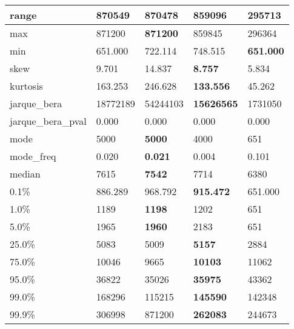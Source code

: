 \begin{table}[H]
\begin{tabular}{|l|m{10em}|m{10em}|m{10em}|m{10em}|}
\hline range & 870549 & \bfseries 870478 & 859096 & \cellcolor[rgb]{0.9, 0.54, 0.52} 295713 \\
\hline max & 871200 & \bfseries 871200 & 859845 & \cellcolor[rgb]{0.9, 0.54, 0.52} 296364 \\
\hline min & 651.000 & 722.114 & \cellcolor[rgb]{0.9, 0.54, 0.52} 748.515 & \bfseries 651.000 \\
\hline skew & 9.701 & \cellcolor[rgb]{0.9, 0.54, 0.52} 14.837 & \bfseries 8.757 & 5.834 \\
\hline kurtosis & 163.253 & 246.628 & \bfseries 133.556 & \cellcolor[rgb]{0.9, 0.54, 0.52} 45.262 \\
\hline jarque\_bera & 18772189 & \cellcolor[rgb]{0.9, 0.54, 0.52} 54244103 & \bfseries 15626565 & 1731050 \\
\hline jarque\_bera\_pval & 0.000 & 0.000 & 0.000 & 0.000 \\
\hline mode & 5000 & \bfseries 5000 & 4000 & \cellcolor[rgb]{0.9, 0.54, 0.52} 651 \\
\hline mode\_freq & 0.020 & \bfseries 0.021 & 0.004 & \cellcolor[rgb]{0.9, 0.54, 0.52} 0.101 \\
\hline median & 7615 & \bfseries 7542 & 7714 & \cellcolor[rgb]{0.9, 0.54, 0.52} 6380 \\
\hline 0.1\% & 886.289 & 968.792 & \bfseries 915.472 & \cellcolor[rgb]{0.9, 0.54, 0.52} 651.000 \\
\hline 1.0\% & 1189 & \bfseries 1198 & 1202 & \cellcolor[rgb]{0.9, 0.54, 0.52} 651 \\
\hline 5.0\% & 1965 & \bfseries 1960 & 2183 & \cellcolor[rgb]{0.9, 0.54, 0.52} 651 \\
\hline 25.0\% & 5083 & 5009 & \bfseries 5157 & \cellcolor[rgb]{0.9, 0.54, 0.52} 2884 \\
\hline 75.0\% & 10046 & 9665 & \bfseries 10103 & \cellcolor[rgb]{0.9, 0.54, 0.52} 11062 \\
\hline 95.0\% & 36822 & 35026 & \bfseries 35975 & \cellcolor[rgb]{0.9, 0.54, 0.52} 43362 \\
\hline 99.0\% & 168296 & \cellcolor[rgb]{0.9, 0.54, 0.52} 115215 & \bfseries 145590 & 142348 \\
\hline 99.9\% & 306998 & \cellcolor[rgb]{0.9, 0.54, 0.52} 871200 & \bfseries 262083 & 244673 \\
\hline
\end{tabular}
\end{table}
